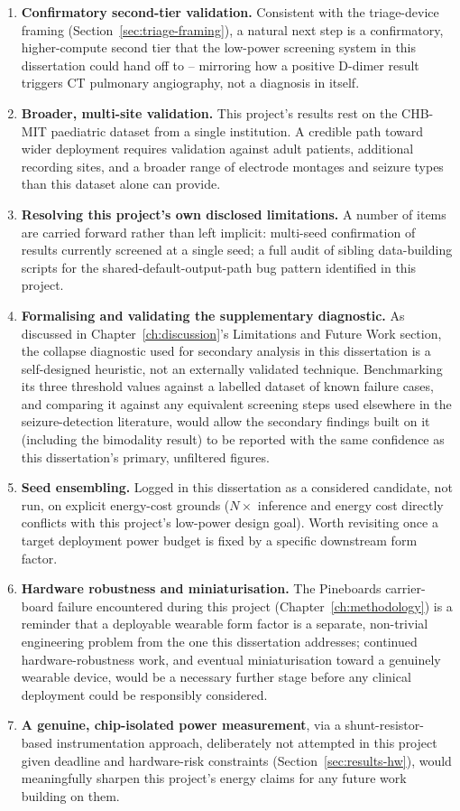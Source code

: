 \begin{enumerate}
    \item \textbf{Confirmatory second-tier validation.} Consistent with the triage-device framing (Section~\ref{sec:triage-framing}), a natural next step is a confirmatory, higher-compute second tier that the low-power screening system in this dissertation could hand off to -- mirroring how a positive D-dimer result triggers CT pulmonary angiography, not a diagnosis in itself.
    \item \textbf{Broader, multi-site validation.} This project's results rest on the CHB-MIT paediatric dataset from a single institution. A credible path toward wider deployment requires validation against adult patients, additional recording sites, and a broader range of electrode montages and seizure types than this dataset alone can provide.
    \item \textbf{Resolving this project's own disclosed limitations.} A number of items are carried forward rather than left implicit: multi-seed confirmation of results currently screened at a single seed; a full audit of sibling data-building scripts for the shared-default-output-path bug pattern identified in this project.
    \item \textbf{Formalising and validating the supplementary diagnostic.} As discussed in Chapter~\ref{ch:discussion}'s Limitations and Future Work section, the collapse diagnostic used for secondary analysis in this dissertation is a self-designed heuristic, not an externally validated technique. Benchmarking its three threshold values against a labelled dataset of known failure cases, and comparing it against any equivalent screening steps used elsewhere in the seizure-detection literature, would allow the secondary findings built on it (including the bimodality result) to be reported with the same confidence as this dissertation's primary, unfiltered figures.    \item \textbf{Seed ensembling.} Logged in this dissertation as a considered candidate, not run, on explicit energy-cost grounds ($N\times$ inference and energy cost directly conflicts with this project's low-power design goal). Worth revisiting once a target deployment power budget is fixed by a specific downstream form factor.
    \item \textbf{Hardware robustness and miniaturisation.} The Pineboards carrier-board failure encountered during this project (Chapter~\ref{ch:methodology}) is a reminder that a deployable wearable form factor is a separate, non-trivial engineering problem from the one this dissertation addresses; continued hardware-robustness work, and eventual miniaturisation toward a genuinely wearable device, would be a necessary further stage before any clinical deployment could be responsibly considered.
    \item \textbf{A genuine, chip-isolated power measurement}, via a shunt-resistor-based instrumentation approach, deliberately not attempted in this project given deadline and hardware-risk constraints (Section~\ref{sec:results-hw}), would meaningfully sharpen this project's energy claims for any future work building on them.
\end{enumerate}

